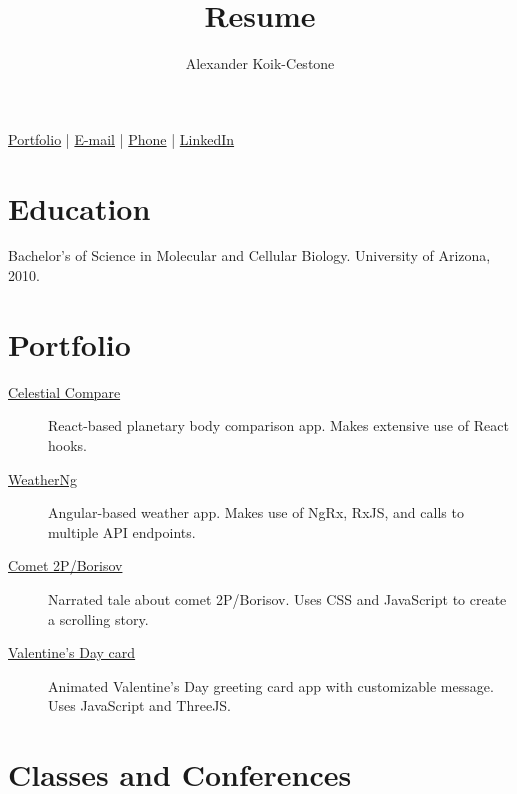 \documentclass{article}
\author{Alexander Koik-Cestone}
\title{Resume}
\begin{document}
\maketitle
\begin{center}
\href{https://sirkoik.github.io#portfolio}{Portfolio} |
\href{mailto:akoikcestone@gmail.com}{E-mail} |
\href{tel:614-674-0668}{Phone} |
\href{https://www.linkedin.com/in/alexander-koik-cestone-89304556/}{LinkedIn}
\end{center}

\section{Education}
Bachelor's of Science in Molecular and Cellular Biology. University of Arizona, 2010.

\section{Portfolio}

\begin{description}
  \item[\href{https://sirkoik.github.io/Celestial-Compare}{Celestial Compare}] React-based planetary body comparison app. Makes extensive use of React hooks.
  \item[\href{https://sirkoik.github.io/WeatherNg}{WeatherNg}] Angular-based weather app. Makes use of NgRx, RxJS, and calls to multiple API endpoints. 
  \item[\href{https://sirkoik.github.io/BorisovXmas}{Comet 2P/Borisov}] Narrated tale about comet 2P/Borisov. Uses CSS and JavaScript to create a scrolling story. 
  \item[\href{https://sirkoik.github.io/February}{Valentine's Day card}] Animated Valentine's Day greeting card app with customizable message. Uses JavaScript and ThreeJS.
\end{description}



\section{Classes and Conferences}
\end{document}
